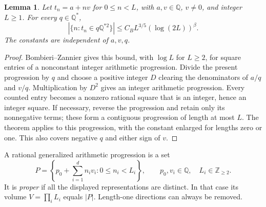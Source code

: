 \documentclass[11pt,letterpaper]{article}
\newtheorem{lemma}[theorem]{Lemma}
\theoremstyle{remark}\newtheorem{remark}[theorem]{Remark}
\newcommand{\Q}{\mathbb Q}
\begin{document}
\begin{lemma}\label{lem:AP}
Let $t_n=a+nv$ for $0\le n<L$, with $a,v\in\Q$, $v\ne0$, and integer $L\ge1$. For every $q\in\Q^*$,
\begin{equation}\label{eq:AP}
 |\{n:t_n\in q\Q^{*2}\}|\le C_B L^{3/5}(\log(2L))^{\beta}.
\end{equation}
The constants are independent of $a,v,q$.
\end{lemma}
\begin{proof}
Bombieri--Zannier \cite[Theorem 1]{BZ} gives this bound, with $\log L$ for $L\ge2$, for square entries of a nonconstant integer arithmetic progression. Divide the present progression by $q$ and choose a positive integer $D$ clearing the denominators of $a/q$ and $v/q$. Multiplication by $D^2$ gives an integer arithmetic progression. Every counted entry becomes a nonzero rational square that is an integer, hence an integer square. If necessary, reverse the progression and retain only its nonnegative terms; these form a contiguous progression of length at most $L$. The theorem applies to this progression, with the constant enlarged for lengths zero or one. This also covers negative $q$ and either sign of $v$.
\end{proof}

A rational generalized arithmetic progression is a set
\begin{equation}\label{eq:GAP}
 P=\left\{p_0+\sum_{i=1}^{d}n_iv_i:0\le n_i<L_i\right\},
 \qquad p_0,v_i\in\Q,\quad L_i\in\mathbb Z_{\ge2}.
\end{equation}
It is \emph{proper} if all the displayed representations are distinct. In that case its volume $V=\prod_iL_i$ equals $|P|$. Length-one directions can always be removed.
\end{document}
